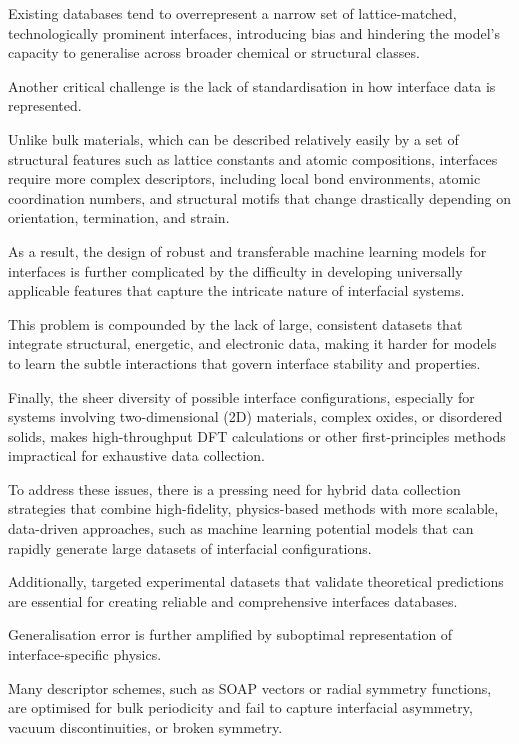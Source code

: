 Existing databases tend to overrepresent a narrow set of lattice-matched, technologically prominent interfaces,
introducing bias and hindering the model's capacity to generalise across broader chemical or structural classes.


Another critical challenge is the lack of standardisation in how interface data is represented.

Unlike bulk materials, which can be described relatively easily by a set of structural features such as lattice
constants and atomic compositions, interfaces require more complex descriptors, including local bond environments,
atomic coordination numbers, and structural motifs that change drastically depending on orientation, termination, and
strain.

As a result, the design of robust and transferable machine learning models for interfaces is further complicated by the
difficulty in developing universally applicable features that capture the intricate nature of interfacial systems.

This problem is compounded by the lack of large, consistent datasets that integrate structural, energetic, and
electronic data, making it harder for models to learn the subtle interactions that govern interface stability and
properties.


Finally, the sheer diversity of possible interface configurations, especially for systems involving two-dimensional (2D)
materials, complex oxides, or disordered solids, makes high-throughput DFT calculations or other first-principles
methods impractical for exhaustive data collection.

To address these issues, there is a pressing need for hybrid data collection strategies that combine high-fidelity,
physics-based methods with more scalable, data-driven approaches, such as machine learning potential models that can
rapidly generate large datasets of interfacial configurations.

Additionally, targeted experimental datasets that validate theoretical predictions are essential for creating reliable
and comprehensive interfaces databases.


Generalisation error is further amplified by suboptimal representation of interface-specific physics.

Many descriptor schemes, such as SOAP vectors or radial symmetry functions, are optimised for bulk periodicity and fail
to capture interfacial asymmetry, vacuum discontinuities, or broken symmetry.

